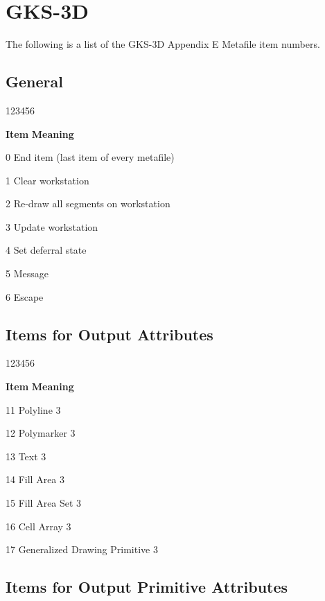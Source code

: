 \section{GKS-3D}
 
The following is a list of the GKS-3D Appendix E Metafile item numbers.

\subsection*{General}

\begin{DLtt}{123456}
\item[{\rm\bf Item}] {\bf Meaning}
\item[0]End item (last item of every metafile)
\item[1]Clear workstation
\item[2]Re-draw all segments on workstation
\item[3]Update workstation
\item[4]Set deferral state
\item[5]Message
\item[6]Escape
\end{DLtt}

\subsection*{Items for Output Attributes}

\begin{DLtt}{123456}
\item[{\rm\bf Item}] {\bf Meaning}
\item[11]Polyline 3
\item[12]Polymarker 3
\item[13]Text 3
\item[14]Fill Area 3
\item[15]Fill Area Set 3
\item[16]Cell Array 3
\item[17]Generalized Drawing Primitive 3
\end{DLtt}

\subsection*{Items for Output Primitive Attributes}


